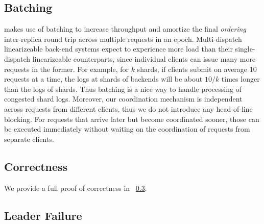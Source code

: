 \subsection{Batching}
\md makes use of batching to increase throughput and amortize the final \textit{ordering} inter-replica round trip across multiple requests in an epoch. Multi-dispatch linearizeable back-end systems expect to experience more load than their single-dispatch linearizeable counterparts, since individual clients can issue many more requests in the former. For example, for $k$ shards, if clients submit on average 10 requests at a time, the logs at shards of \md backends will be about $10/k$ times longer than the logs of \sd shards. Thus batching is a nice way to handle processing of congested shard logs. Moreover, our coordination mechanism is independent across requests from different clients, thus we do not introduce any head-of-line blocking. For requests that arrive later but become coordinated sooner, those can be executed immediately without waiting on the coordination of requests from separate clients.

\subsection{Correctness}
We provide a full proof of correctness in ~\ref{}.

\subsection{Leader Failure}


